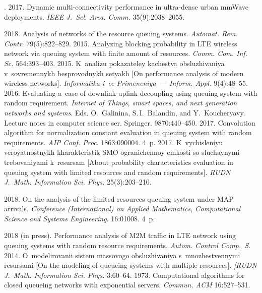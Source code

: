 \begin{multicols}{2}
{{\begin{thebibliography}{99}
. 
2017. Dynamic multi-connectivity performance in ultra-dense urban 
mmWave deployments. \textit{IEEE J.~Sel. Area. Comm.} 35(9):2038--2055.

 2018. 
Analysis of networks of the resource queuing systems. 
\textit{Automat. Rem. Contr}. 79(5):822--829.
 2015. 
Analyzing blocking probability in LTE wireless network via queuing system 
with finite amount of resources. 
\textit{Comm. Com. Inf. Sc.} 564:393--403.
2015. K~analizu pokazateley kachestva obsluzhivaniya 
v~sovremennykh besprovodnykh setyakh [On performance analysis of modern 
wireless networks]. \textit{Informatika i~ee Primeneniya~---
Inform. Appl.} 9(4):48--55.
 2016. Evaluating a~case of downlink uplink decoupling 
using queuing system with random requirement. 
\textit{Internet of Things, smart spaces, and
next generation
networks and systems}.
Eds. O.~Galinina, S.\,I.~Balandin, and Y.~Koucheryavy.
{Lecture notes in computer science ser.} Springer. 9870:440--450.
2017. Convolution algorithm for normalization constant evaluation in 
queuing system with random requirements. \textit{AIP Conf. Proc}. 
1863:090004. 4~p.
 2017. 
K~vychisleniyu veroyatnostnykh kharakteristik SMO ogranichennoy emkosti so 
sluchaynymi trebovaniyami k~resursam [About probability characteristics evaluation 
in queuing system with limited resources and random requirements]. 
\textit{RUDN J.~Math. Information Sci. Phys.} 25(3):203--210.

 2018. On the analysis of the limited resources 
queuing system under MAP arrivals. 
\textit{Conference (International) 
on Applied Mathematics, Computational Science and Systems Engineering}. 16:01008. 4~p.

 2018 (in press).
 Performance analysis of M2M traffic in LTE network using queuing systems 
 with random resource requirements. 
 \textit{Autom. Control Comp.~S.}
 2014. 
O~modelirovanii sistem massovogo obsluzhivaniya s~mnozhestvennymi resursami 
[On the modeling of queueing systems with multiple resources]. 
\textit{[RUDN J.~Math. Information Sci. Phys.} 3:60--64.
 1973. Computational algorithms for closed queueing 
networks with exponential servers. \textit{Commun. ACM} 16:527--531.


\end{thebibliography}}}
\end{multicols}
